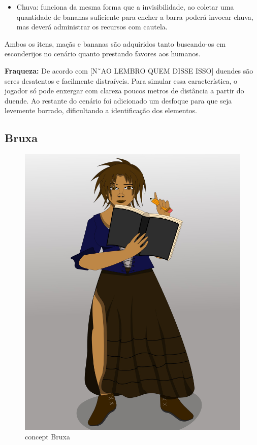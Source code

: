 \begin{itemize}
\item Chuva:  funciona da mesma forma que a invisibilidade, ao coletar uma quantidade de bananas suficiente para encher a barra poderá invocar chuva, mas deverá administrar os recursos com cautela.
\end{itemize}
Ambos os itens, maçãs e bananas são adquiridos tanto buscando-os em esconderijos no cenário quanto prestando favores aos humanos.

\textbf{Fraqueza:} De acordo com [N˜AO LEMBRO QUEM DISSE ISSO] duendes são seres desatentos e facilmente distraíveis. Para simular essa característica, o jogador só pode enxergar com clareza poucos metros de distância a partir do duende. Ao restante do cenário foi adicionado um desfoque para que seja levemente borrado, dificultando a identificação dos elementos.

\subsection{Bruxa}

\begin{figure}[htb]
	\caption{concept Bruxa}
	\begin{center}
	    \includegraphics[width=\textwidth/2]{imagens/capaportifolio.jpeg}
	\end{center}
\end{figure}


